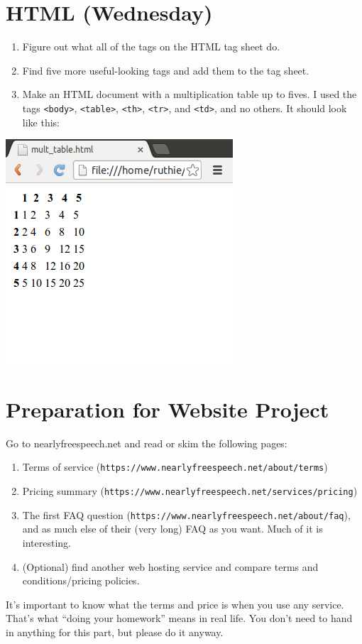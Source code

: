 \documentclass{article}
\begin{document}
\section{HTML (Wednesday)}

\begin{enumerate}[a]
\item Figure out what all of the tags on the HTML tag sheet do.
\item Find five more useful-looking tags and add them to the tag sheet.
\item Make an HTML document with a multiplication table up to fives.  I used the tags \texttt{<body>}, \texttt{<table>}, \texttt{<th>}, \texttt{<tr>}, and \texttt{<td>}, and no others.  It should look like this:

\end{enumerate}
\includegraphics{mult_table_output.png}

\vspace{-3 cm}
\section{Preparation for Website Project}
Go to nearlyfreespeech.net and read or skim the following pages:
\begin{enumerate} 
\item Terms of service (\texttt{https://www.nearlyfreespeech.net/about/terms})
\item Pricing summary (\texttt{https://www.nearlyfreespeech.net/services/pricing})
\item The first FAQ question (\texttt{https://www.nearlyfreespeech.net/about/faq}), and as much else of their (very long) FAQ as you want.  Much of it is interesting.
\item (Optional) find another web hosting service and compare terms and conditions/pricing policies.
\end{enumerate}

It's important to know what the terms and price is when you use any service.  That's what ``doing your homework'' means in real life.  You don't need to hand in anything for this part, but please do it anyway.
\end{document}
